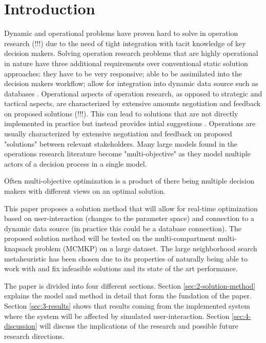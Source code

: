 \documentclass[preprint,12pt,authoryear]{elsarticle}
\begin{document}

\section{Introduction}
\label{sec:1-introduction}

Dynamic and operational problems have proven hard to solve in operation research (!!!) due to the need of tight integration with tacit knowledge of key decision makers.
Solving operation research problems that are highly operational in nature have three additional requirements over conventional static solution approaches: they have to be very responsive; 
able to be assimilated into the decision makers workflow; allow for integration into dynamic data source such as databases \citep{meignan_review_2015}. 
Operational aspects of operation research, as opposed to strategic and tactical aspects, are characterized by extensive amounts negotiation and feedback on 
proposed solutions (!!!). This can lead to solutions that are not directly implemented in practice but instead provides intial suggestions \cite{meignan_review_2015}. 
Operations are usually characterized by extensive negotiation and feedback on proposed "solutions" between relevant stakeholders. Many large models found in the
operations research literature become "multi-objective" as they model multiple actors of a decision process in a single model.

Often multi-objective optimization is a product of there being multiple decision makers with different views on an optimal solution.

This paper proposes a solution method that will allow for real-time optimization based on user-interaction (changes to the parameter space) and connection to a dynamic 
data source (in practice this could be a database connection). The proposed solution method will be tested on the multi-compartment multi-knapsack problem (MCMKP) on a large dataset. 
The large neighborhood search metaheuristic has been chosen due to its properties of naturally being able to work with and fix infeasible solutions and its state of the 
art performance. 

The paper is divided into four different sections. Section \ref{sec:2-solution-method} explains the model and method in detail that form the fundation of the paper. 
Section \ref{sec:3-results} shows that results coming from the implemented system where the system will be affected by simulated user-interaction. Section \ref{sec:4-discussion} 
will discuss the implications of the research and possible future research directions.
\end{document}
